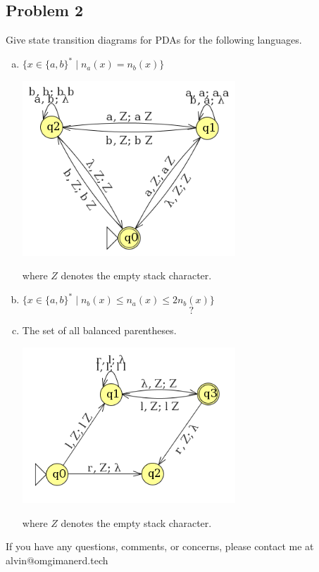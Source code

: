 \documentclass{math}
\begin{document}
\subsection*{Problem 2}
Give state transition diagrams for PDAs for the following languages.
\begin{enumerate}[(a)]
  \item \( \{x\in\{a,b\}^*\mid n_a(x) = n_b(x)\} \)
  \begin{center}
    \includegraphics[width=8cm]{assets/hw_09_2a.png}
  \end{center}
  where \( Z \) denotes the empty stack character.
  \item \( \{x\in\{a,b\}^*\mid n_b(x)\le n_a(x)\le 2n_b(x)\} \)
  \[ ? \]
  \item The set of all balanced parentheses.
  \begin{center}
    \includegraphics[width=8cm]{assets/hw_09_2c.png}
  \end{center}
  where \( Z \) denotes the empty stack character.
\end{enumerate}

\begin{center}
  If you have any questions, comments, or concerns, please contact me at
  alvin@omgimanerd.tech
\end{center}
\end{document}
